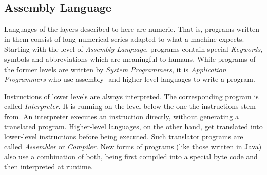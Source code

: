 %
%
%
%
%
%
%

\subsection{Assembly Language}
\label{assembly_language_heading}

Languages of the layers described to here are numeric. That is, programs
written in them consist of long numerical series adapted to what a machine
expects. Starting with the level of \emph{Assembly Language}, programs contain
special \emph{Keywords}, symbols and abbreviations which are meaningful to
humans. While programs of the former levels are written by
\emph{System Programmers}, it is \emph{Application Programmers} who use
assembly- and higher-level languages to write a program.

Instructions of lower levels are always interpreted. The corresponding program
is called \emph{Interpreter}. It is running on the level below the one the
instructions stem from. An interpreter executes an instruction directly,
without generating a translated program. Higher-level languages, on the other
hand, get translated into lower-level instructions before being executed. Such
translator programs are called \emph{Assembler} or \emph{Compiler}. New forms
of programs (like those written in Java) also use a combination of both, being
first compiled into a special byte code and then interpreted at runtime.
